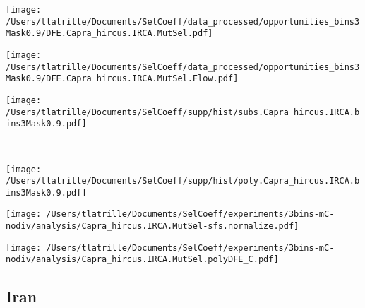 \documentclass{article}
\begin{document}
    \begin{minipage}{0.32\linewidth}
        \texttt{[image: /Users/tlatrille/Documents/SelCoeff/data\_processed/opportunities\_bins3Mask0.9/DFE.Capra\_hircus.IRCA.MutSel.pdf]}
    \end{minipage}
    \begin{minipage}{0.32\linewidth}
        \texttt{[image: /Users/tlatrille/Documents/SelCoeff/data\_processed/opportunities\_bins3Mask0.9/DFE.Capra\_hircus.IRCA.MutSel.Flow.pdf]}
    \end{minipage}
    \begin{minipage}{0.32\linewidth}
        \texttt{[image: /Users/tlatrille/Documents/SelCoeff/supp/hist/subs.Capra\_hircus.IRCA.bins3Mask0.9.pdf]}
    \end{minipage}
    \\
    \begin{minipage}{0.32\linewidth}
        \texttt{[image: /Users/tlatrille/Documents/SelCoeff/supp/hist/poly.Capra\_hircus.IRCA.bins3Mask0.9.pdf]}
    \end{minipage}
    \begin{minipage}{0.32\linewidth}
        \texttt{[image: /Users/tlatrille/Documents/SelCoeff/experiments/3bins-mC-nodiv/analysis/Capra\_hircus.IRCA.MutSel-sfs.normalize.pdf]}
    \end{minipage}
    \begin{minipage}{0.32\linewidth}
        \texttt{[image: /Users/tlatrille/Documents/SelCoeff/experiments/3bins-mC-nodiv/analysis/Capra\_hircus.IRCA.MutSel.polyDFE\_C.pdf]}
    \end{minipage}
    \subsection{Iran}
\end{document}

